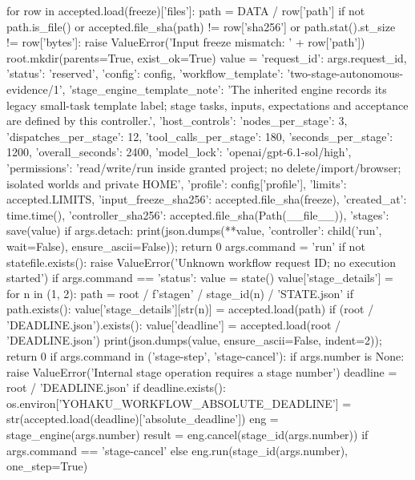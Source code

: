             for row in accepted.load(freeze)['files']:
                path = DATA / row['path']
                if not path.is_file() or accepted.file_sha(path) != row['sha256'] or path.stat().st_size != row['bytes']:
                    raise ValueError('Input freeze mismatch: ' + row['path'])
            root.mkdir(parents=True, exist_ok=True)
            value = {'request_id': args.request_id, 'status': 'reserved', 'config': config,
                     'workflow_template': 'two-stage-autonomous-evidence/1',
                     'stage_engine_template_note': 'The inherited engine records its legacy small-task template label; stage tasks, inputs, expectations and acceptance are defined by this controller.',
                     'host_controls': {'nodes_per_stage': 3, 'dispatches_per_stage': 12, 'tool_calls_per_stage': 180,
                        'seconds_per_stage': 1200, 'overall_seconds': 2400, 'model_lock': 'openai/gpt-6.1-sol/high',
                        'permissions': 'read/write/run inside granted project; no delete/import/browser; isolated worlds and private HOME'},
                     'profile': config['profile'], 'limits': accepted.LIMITS,
                     'input_freeze_sha256': accepted.file_sha(freeze), 'created_at': time.time(),
                     'controller_sha256': accepted.file_sha(Path(__file__)), 'stages': {}}
            save(value)
        if args.detach:
            print(json.dumps({**value, 'controller': child('run', wait=False)}, ensure_ascii=False)); return 0
        args.command = 'run'
    if not statefile.exists():
        raise ValueError('Unknown workflow request ID; no execution started')
    if args.command == 'status':
        value = state()
        value['stage_details'] = {}
        for n in (1, 2):
            path = root / f'stage{n}' / stage_id(n) / 'STATE.json'
            if path.exists():
                value['stage_details'][str(n)] = accepted.load(path)
        if (root / 'DEADLINE.json').exists():
            value['deadline'] = accepted.load(root / 'DEADLINE.json')
        print(json.dumps(value, ensure_ascii=False, indent=2)); return 0
    if args.command in ('stage-step', 'stage-cancel'):
        if args.number is None:
            raise ValueError('Internal stage operation requires a stage number')
        deadline = root / 'DEADLINE.json'
        if deadline.exists():
            os.environ['YOHAKU_WORKFLOW_ABSOLUTE_DEADLINE'] = str(accepted.load(deadline)['absolute_deadline'])
        eng = stage_engine(args.number)
        result = eng.cancel(stage_id(args.number)) if args.command == 'stage-cancel' else eng.run(stage_id(args.number), one_step=True)
